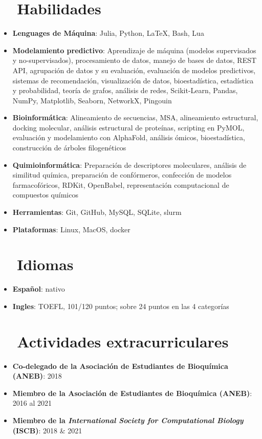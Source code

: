 \documentclass[letter,20pt]{article}
\newcommand{\resumeItem}[2]{
  \item\small{
    \textbf{#1}{: #2 \vspace{-2pt}}
  }
}
\newcommand{\resumeSubItem}[2]{\resumeItem{#1}{#2}\vspace{-3pt}}
\newcommand{\resumeSubHeadingListStart}{\begin{itemize}[leftmargin=*]}
\newcommand{\resumeSubHeadingListEnd}{\end{itemize}}
\begin{document}
\section{~~Habilidades}
\resumeSubHeadingListStart
\resumeSubItem{Lenguages de Máquina}{Julia, Python, LaTeX, Bash, Lua}
\resumeSubItem{Modelamiento predictivo}{Aprendizaje de máquina (modelos supervisados y no-supervisados), procesamiento de datos, manejo de bases de datos, REST API, agrupación de datos y su evaluación, evaluación de modelos predictivos, sistemas de recomendación, visualización de datos, bioestadística, estadística y probabilidad, teoría de grafos, análisis de redes, Scikit-Learn, Pandas, NumPy, Matplotlib, Seaborn, NetworkX, Pingouin}
\resumeSubItem{Bioinformática}{Alineamiento de secuencias, MSA, alineamiento estructural, docking molecular, análisis estructural de proteínas, scripting en PyMOL, evaluación y modelamiento con AlphaFold, análisis ómicos, bioestadística, construcción de árboles filogenéticos}
\resumeSubItem{Quimioinformática}{Preparación de descriptores moleculares, análisis de similitud química, preparación de confórmeros, confección de modelos farmacofóricos, RDKit, OpenBabel, representación computacional de compuestos químicos}
\resumeSubItem{Herramientas}{Git, GitHub, MySQL, SQLite, slurm}
\resumeSubItem{Plataformas}{Linux, MacOS, docker}
\resumeSubHeadingListEnd
\vspace{5pt}
\section{~~Idiomas}
\resumeSubHeadingListStart
\resumeSubItem{Español}{nativo}
\resumeSubItem{Ingles}{TOEFL, 101/120 puntos; sobre 24 puntos en las 4 categorías}
\resumeSubHeadingListEnd
\vspace{5pt}
\section{~~Actividades extracurriculares}
\resumeSubHeadingListStart
\resumeSubItem{Co-delegado de la Asociación de Estudiantes de Bioquímica (ANEB)}{2018}
\resumeSubItem{Miembro de la Asociación de Estudiantes de Bioquímica (ANEB)}{2016 al 2021}
\resumeSubItem{Miembro de la \textit{International Society for Computational Biology} (ISCB)}{2018 \& 2021}
\resumeSubHeadingListEnd
\vspace{5pt}
\end{document}
